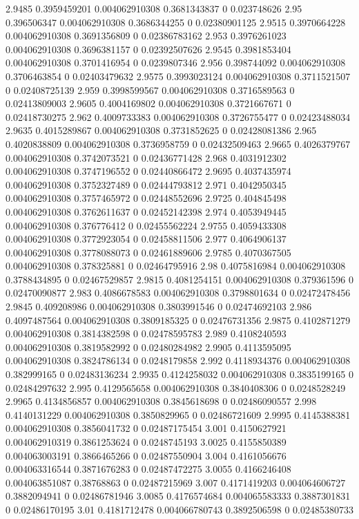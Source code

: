 {2.9485 0.3959459201 0.004062910308 0.3681343837 0 0.023748626
2.95 0.396506347 0.004062910308 0.3686344255 0 0.02380901125
2.9515 0.3970664228 0.004062910308 0.3691356809 0 0.02386783162
2.953 0.3976261023 0.004062910308 0.3696381157 0 0.02392507626
2.9545 0.3981853404 0.004062910308 0.3701416954 0 0.0239807346
2.956 0.398744092 0.004062910308 0.3706463854 0 0.02403479632
2.9575 0.3993023124 0.004062910308 0.3711521507 0 0.02408725139
2.959 0.3998599567 0.004062910308 0.3716589563 0 0.02413809003
2.9605 0.4004169802 0.004062910308 0.3721667671 0 0.02418730275
2.962 0.4009733383 0.004062910308 0.3726755477 0 0.02423488034
2.9635 0.4015289867 0.004062910308 0.3731852625 0 0.02428081386
2.965 0.4020838809 0.004062910308 0.3736958759 0 0.02432509463
2.9665 0.4026379767 0.004062910308 0.3742073521 0 0.02436771428
2.968 0.4031912302 0.004062910308 0.3747196552 0 0.02440866472
2.9695 0.4037435974 0.004062910308 0.3752327489 0 0.02444793812
2.971 0.4042950345 0.004062910308 0.3757465972 0 0.02448552696
2.9725 0.404845498 0.004062910308 0.3762611637 0 0.02452142398
2.974 0.4053949445 0.004062910308 0.376776412 0 0.02455562224
2.9755 0.4059433308 0.004062910308 0.3772923054 0 0.02458811506
2.977 0.4064906137 0.004062910308 0.3778088073 0 0.02461889606
2.9785 0.4070367505 0.004062910308 0.378325881 0 0.02464795916
2.98 0.4075816984 0.004062910308 0.3788434895 0 0.02467529857
2.9815 0.4081254151 0.004062910308 0.379361596 0 0.02470090877
2.983 0.4086678583 0.004062910308 0.3798801634 0 0.02472478456
2.9845 0.409208986 0.004062910308 0.3803991546 0 0.02474692103
2.986 0.4097487564 0.004062910308 0.3809185325 0 0.02476731356
2.9875 0.4102871279 0.004062910308 0.3814382598 0 0.02478595783
2.989 0.4108240593 0.004062910308 0.3819582992 0 0.02480284982
2.9905 0.4113595095 0.004062910308 0.3824786134 0 0.0248179858
2.992 0.4118934376 0.004062910308 0.382999165 0 0.02483136234
2.9935 0.4124258032 0.004062910308 0.3835199165 0 0.02484297632
2.995 0.4129565658 0.004062910308 0.3840408306 0 0.0248528249
2.9965 0.4134856857 0.004062910308 0.3845618698 0 0.02486090557
2.998 0.4140131229 0.004062910308 0.3850829965 0 0.02486721609
2.9995 0.4145388381 0.004062910308 0.3856041732 0 0.02487175454
3.001 0.4150627921 0.004062910319 0.3861253624 0 0.0248745193
3.0025 0.4155850389 0.004063003191 0.3866465266 0 0.02487550904
3.004 0.4161056676 0.004063316544 0.3871676283 0 0.02487472275
3.0055 0.4166246408 0.004063851087 0.38768863 0 0.02487215969
3.007 0.4171419203 0.004064606727 0.3882094941 0 0.02486781946
3.0085 0.4176574684 0.004065583333 0.3887301831 0 0.02486170195
3.01 0.4181712478 0.004066780743 0.3892506598 0 0.02485380733
}
